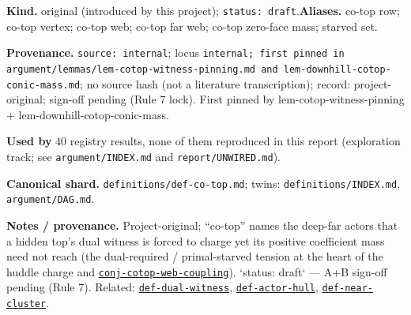 \begin{defnote}
\textbf{Kind.} original (introduced by this project); \texttt{status: draft}.\quad\textbf{Aliases.} co-top row; co-top vertex; co-top web; co-top far web; co-top zero-face mass; starved set.
\par
\textbf{Provenance.} \texttt{source: internal}; locus \texttt{internal;\allowbreak{} first pinned in argument/\allowbreak{}lemmas/\allowbreak{}lem-\allowbreak{}cotop-\allowbreak{}witness-\allowbreak{}pinning.\allowbreak{}md and lem-\allowbreak{}downhill-\allowbreak{}cotop-\allowbreak{}conic-\allowbreak{}mass.\allowbreak{}md}; no source hash (not a literature transcription); record: project-\allowbreak{}original;\allowbreak{} sign-\allowbreak{}off pending (Rule 7 lock).\allowbreak{} First pinned by lem-\allowbreak{}cotop-\allowbreak{}witness-\allowbreak{}pinning + lem-\allowbreak{}downhill-\allowbreak{}cotop-\allowbreak{}conic-\allowbreak{}mass.
\par
\textbf{Used by} 40 registry results, none of them reproduced in this report (exploration track; see \texttt{argument/INDEX.md} and \texttt{report/UNWIRED.md}).
\par
\textbf{Canonical shard.} \texttt{definitions/\allowbreak{}def-\allowbreak{}co-\allowbreak{}top.\allowbreak{}md}; twins: \texttt{definitions/INDEX.md}, \texttt{argument/DAG.md}.
\par
\textbf{Notes / provenance.} Project-original; ``co-top'' names the deep-far actors that a hidden top's dual
witness is forced to charge yet its positive coefficient mass need not reach (the dual-required /
primal-starved tension at the heart of the huddle charge and \hyperlink{dag:conj-cotop-web-coupling}{\texttt{conj-\allowbreak{}cotop-\allowbreak{}web-\allowbreak{}coupling}}). `status:
draft` --- A+B sign-off pending (Rule 7). Related: \hyperref[def:dual-witness]{\texttt{def-\allowbreak{}dual-\allowbreak{}witness}}, \hyperref[def:actor-hull]{\texttt{def-\allowbreak{}actor-\allowbreak{}hull}},
\hyperref[def:near-cluster]{\texttt{def-\allowbreak{}near-\allowbreak{}cluster}}.
\end{defnote}

